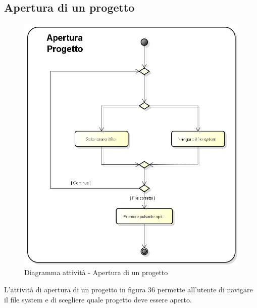 \subsection{Apertura di un progetto}
\begin{figure}[h] 
	\centering 
	\includegraphics[scale=0.3] {img/activity_apertura.png} 
	\caption{Diagramma attività - Apertura di un progetto} 
\end{figure}
L'attività di apertura di un progetto in figura 36 permette all'utente di navigare il file system e di scegliere quale progetto deve essere aperto.
\newpage


